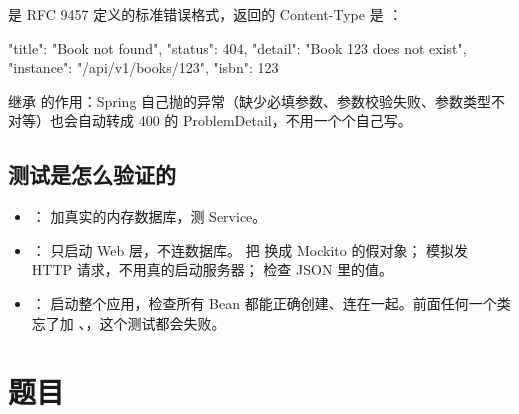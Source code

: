  是 RFC 9457 定义的标准错误格式，返回的 Content-Type 是 ：

\begin{jsoncode}
{
  "title": "Book not found",
  "status": 404,
  "detail": "Book 123 does not exist",
  "instance": "/api/v1/books/123",
  "isbn": 123
}
\end{jsoncode}

继承  的作用：Spring 自己抛的异常（缺少必填参数、参数校验失败、参数类型不对等）也会自动转成 400 的 ProblemDetail，不用一个个自己写。

\subsection{测试是怎么验证的}

\begin{itemize}
  \item {}： 加真实的内存数据库，测 Service。
  \item {}： 只启动 Web 层，不连数据库。 把  换成 Mockito 的假对象； 模拟发 HTTP 请求，不用真的启动服务器； 检查 JSON 里的值。
  \item {}： 启动整个应用，检查所有 Bean 都能正确创建、连在一起。前面任何一个类忘了加 、，这个测试都会失败。
\end{itemize}

\section{题目}

